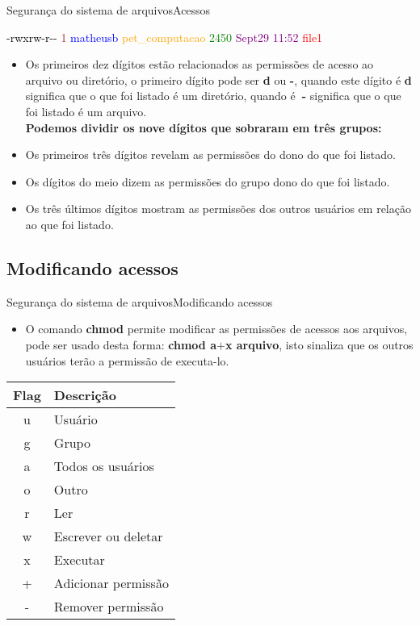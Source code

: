 \documentclass{beamer}
\begin{document}
\begin{frame}{Seguran\c{c}a do sistema de arquivos}{Acessos}
\begin{block}{}
\textcolor{black}{-rwxrw-r-\--} \textcolor{brown}{1} \textcolor{blue}{matheusb} \textcolor{orange}{pet\_computacao} \textcolor{green}{2450} \textcolor{purple}{Sept29 11:52} \textcolor{red}{file1}
\end{block}
\begin{itemize}
\item {Os primeiros dez dígitos estão relacionados as permissões de acesso ao arquivo ou diretório, o primeiro dígito pode ser \textbf{d} ou \textbf{-}, quando este dígito é \textbf{d} significa que o que foi listado é um diretório, quando é\textbf{\ -} significa que o que foi listado é um arquivo.\\ }
\textbf{Podemos dividir os nove dígitos que sobraram em três grupos:}\\
\item{Os primeiros três dígitos revelam as permissões do dono do que foi listado.}
\item{Os dígitos do meio dizem as permissões do grupo dono do que foi listado.}
\item{Os três últimos dígitos mostram as permissões dos outros usuários em rela\c{c}ão ao que foi listado.}
\end{itemize}
\end{frame}

\subsection{Modificando acessos}
\begin{frame}{Seguran\c{c}a do sistema de arquivos}{Modificando acessos}
  \begin{itemize}
  \item {O comando \textbf{chmod} permite modificar as permissões de acessos aos arquivos, pode ser usado desta forma: \textbf{chmod a$+$x arquivo}, isto sinaliza que os outros usuários terão a permissão de executa-lo.}\end{itemize}
  \begin{center}
 \begin{tabular}{||c | p{9cm}||} 
 \hline
 \textbf{Flag} & \textbf{Descri\c{c}ão}\\ [0.5ex] 
 \hline\hline
 u & Usuário\\ 
 \hline
 g & Grupo\\
 \hline
 a & Todos os usuários\\
 \hline
 o & Outro\\
 \hline
 r & Ler\\
 \hline
 w & Escrever ou deletar\\
 \hline
 x& Executar\\
 \hline
 + & Adicionar permissão\\
 \hline
 - & Remover permissão\\
 \hline
\end{tabular}
\end{center}
\end{frame}
\end{document}
